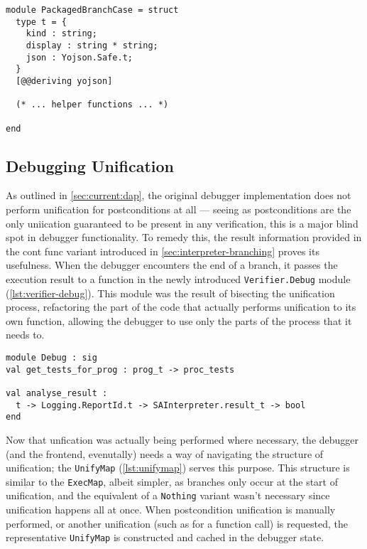 \begin{lstlisting}[caption={
  The \texttt{PackagedBranchCase} type, inside the \texttt{Debugger} module
  \label{lst:packagedbranchcase}}, style=code, numbers=none]
module PackagedBranchCase = struct
  type t = {
    kind : string;
    display : string * string;
    json : Yojson.Safe.t;
  }
  [@@deriving yojson]

  (* ... helper functions ... *)

end
\end{lstlisting}


\subsection{Debugging Unification}

As outlined in \autoref{sec:current:dap}, the original debugger implementation
does not perform unification for postconditions at all --- seeing as
postconditions are the only uniication guaranteed to be present in any
verification, this is a major blind spot in debugger functionality. To remedy
this, the result information provided in the \texttt{} cont func variant
introduced in \autoref{sec:interpreter-branching} proves its usefulness.
When the debugger encounters the end of a branch, it passes the execution
result to a function in the newly introduced \texttt{Verifier.Debug} module
(\autoref{lst:verifier-debug}). This module was the result of bisecting the
unification process, refactoring the part of the code that actually performs
unification to its own function, allowing the debugger to use only the parts
of the process that it needs to.

\begin{lstlisting}[caption={
  The signature of the \texttt{Verifier.Debug} module
  \label{lst:verifier-debug}}, style=code, numbers=none]
module Debug : sig
val get_tests_for_prog : prog_t -> proc_tests

val analyse_result :
  t -> Logging.ReportId.t -> SAInterpreter.result_t -> bool
end
\end{lstlisting}

Now that unfication was actually being performed where necessary, the debugger
(and the frontend, evenutally) needs a way of navigating the structure of
unification; the \texttt{UnifyMap} (\autoref{lst:unifymap}) serves this purpose.
This structure is similar to the \texttt{ExecMap}, albeit simpler, as branches
only occur at the start of unification, and the equivalent of a \texttt{Nothing}
variant wasn't necessary since unification happens all at once. When
postcondition unification is manually performed, or another unification (such as
for a function call) is requested, the representative \texttt{UnifyMap} is
constructed and cached in the debugger state.

